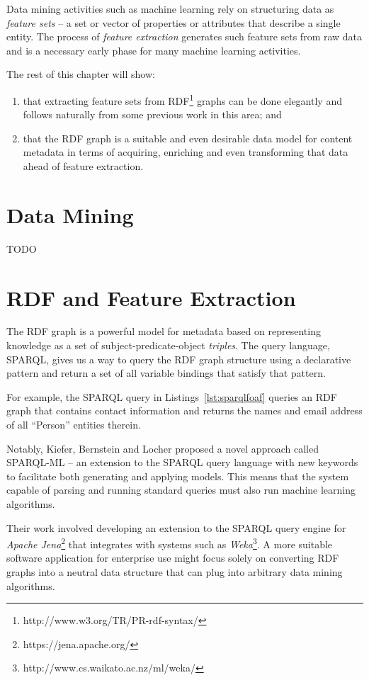 \documentclass[10pt,a4paper]{report}
\begin{document}
Data mining activities such as machine learning rely on structuring data as
\emph{feature sets}\cite{bishop2006pattern} -- a set or vector of properties or
attributes that describe a single entity.
The process of \emph{feature extraction}
generates such feature sets from raw data and is a necessary early phase for
many machine learning activities.

The rest of this chapter will show:

\begin{enumerate}
\item that extracting feature sets from RDF\footnote{http://www.w3.org/TR/PR-rdf-syntax/} graphs can be done elegantly and follows naturally from some
previous work in this area; and
\item that the RDF graph is a suitable and even desirable data model for content
metadata in terms of acquiring, enriching and even transforming that data ahead
of feature extraction.
\end{enumerate}

\section{Data Mining}

TODO

\section{RDF and Feature Extraction}
\label{sec:rdf-and-features}

The RDF graph is a powerful model
for metadata based on representing knowledge as a set of
subject-predicate-object \emph{triples}. The query language, SPARQL, gives us a
way to query the RDF graph structure using a declarative pattern and return a
set of all variable bindings that satisfy that pattern.

For example, the SPARQL query in Listings~\ref{lst:sparqlfoaf}
queries an RDF graph that contains contact information and returns the
names and email address of all ``Person'' entities therein.

Notably, Kiefer, Bernstein and Locher\cite{kiefer2008adding} proposed a novel
approach called SPARQL-ML -- an extension to the
SPARQL\cite{segaran2009programming} query language with new keywords to
facilitate both generating and applying models. This means that the system
capable of parsing and running standard queries must also run machine learning
algorithms.

Their work involved developing an extension to the SPARQL query
engine for \emph{Apache Jena}\footnote{https://jena.apache.org/} that integrates
with systems such as \emph{Weka}\footnote{http://www.cs.waikato.ac.nz/ml/weka/}.
A more suitable software application for enterprise use might focus solely on
converting RDF graphs into a neutral data structure that can plug into arbitrary
data mining algorithms.
\end{document}
